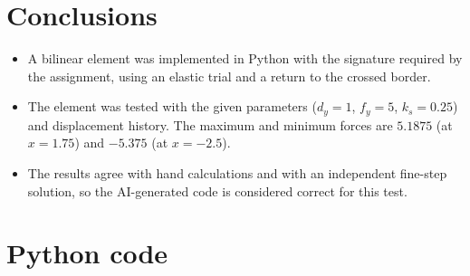 \documentclass[11pt,a4paper]{article}
\begin{document}
\section{Conclusions}
\begin{itemize}
  \item A bilinear element was implemented in Python with the signature required by the
        assignment, using an elastic trial and a return to the crossed border.
  \item The element was tested with the given parameters ($d_y = 1$, $f_y = 5$, $k_s = 0.25$)
        and displacement history. The maximum and minimum forces are $5.1875$ (at $x = 1.75$)
        and $-5.375$ (at $x = -2.5$).
  \item The results agree with hand calculations and with an independent fine-step solution,
        so the AI-generated code is considered correct for this test.
\end{itemize}

\appendix
\section{Python code}\label{app:code}

\end{document}
